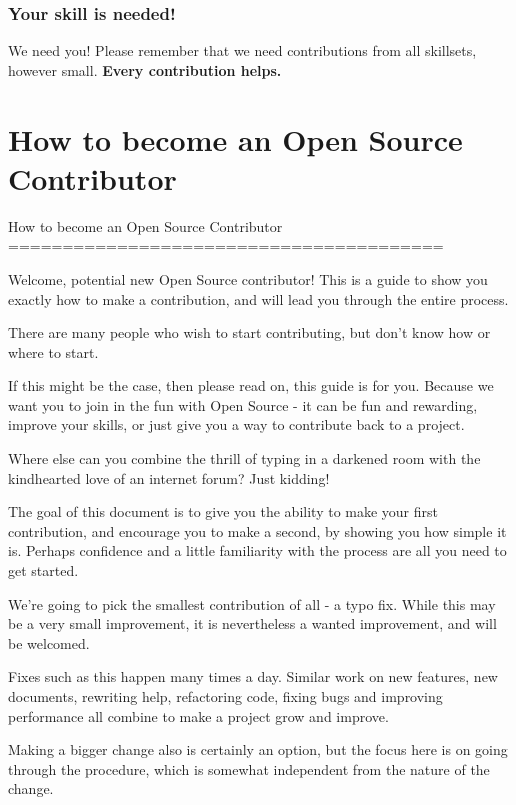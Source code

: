 \documentclass[t,handout]{beamer}
\begin{document}
\begin{frame}[fragile]\frametitle{Your skill is needed!}
    \vfill
    \begin{alertblock}{We need you!}
        Please remember that we need contributions from all skillsets, however small. \textbf{Every contribution helps.}
    \end{alertblock}
    \vfill
\end{frame}

\section{How to become an Open Source Contributor}

\iffalse
How to become an Open Source Contributor
========================================

Welcome, potential new Open Source contributor! This is a guide to show you exactly how to make a contribution, and will lead you through the entire process.

There are many people who wish to start contributing, but don't know how or where to start.

If this might be the case, then please read on, this guide is for
you. Because we want you to join in the fun with Open Source - it
can be fun and rewarding, improve your skills, or just give you a
way to contribute back to a project.

Where else can you combine the thrill of typing in a darkened
room with the kindhearted love of an internet forum?  Just kidding!

The goal of this document is to give you the ability to make your
first contribution, and encourage you to make a second, by showing
you how simple it is. Perhaps confidence and a little familiarity
with the process are all you need to get started.

We're going to pick the smallest contribution of all - a typo fix.
While this may be a very small improvement, it is nevertheless a
wanted improvement, and will be welcomed.

Fixes such as this happen many times a day. Similar work on new
features, new documents, rewriting help, refactoring code, fixing
bugs and improving performance all combine to make a project grow
and improve.

Making a bigger change also is certainly an option, but the focus
here is on going through the procedure, which is somewhat
independent from the nature of the change.
\end{document}
